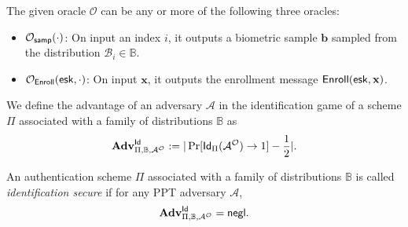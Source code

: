 The given oracle $\mathcal{O}$ can be any or more of the following three oracles:

\begin{itemize}
	\item $\mathcal{O}_{\sf samp}(\cdot)$: On input an index $i$, it outputs a biometric sample $\mathbf{b}$ sampled from the distribution $\mathcal{B}_i \in \mathbb{B}$.
	
	\item $\mathcal{O}_{\sf Enroll}({\sf esk}, \cdot)$: On input $\mathbf{x}$, it outputs the enrollment message ${\sf Enroll}({\sf esk}, \mathbf{x})$.

\end{itemize}

We define the advantage of an adversary $\mathcal{A}$ in the identification game of a scheme $\Pi$ associated with a family of distributions $\mathbb{B}$ as
\[
	\mathbf{Adv}^{\sf Id}_{\Pi, \mathbb{B}, \mathcal{A}^\mathcal{O}} := |\Pr[{\sf Id}_{\Pi}(\mathcal{A}^\mathcal{O}) \to 1] - \frac{1}{2}|.
\]

An authentication scheme $\Pi$ associated with a family of distributions $\mathbb{B}$ is called \emph{identification secure} if for any PPT adversary $\mathcal{A}$,
\[
	\mathbf{Adv}^{\sf Id}_{\Pi, \mathbb{B}, \mathcal{A}^\mathcal{O}} = \mathsf{negl}.
\]







% 

\nocite{*}
\printbibliography



